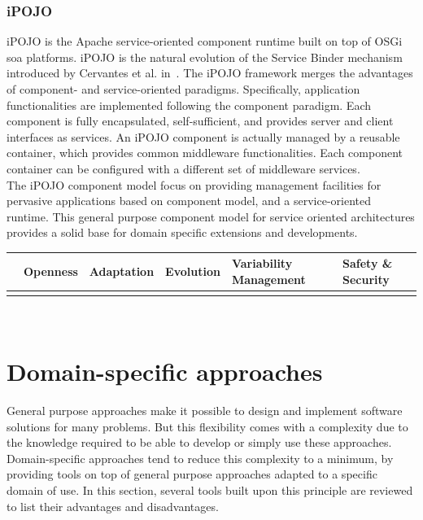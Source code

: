 \subsubsection{iPOJO}
iPOJO\cite{Escoffier:2007} is the Apache service-oriented component runtime built on top of OSGi \gls{soa} platforms. iPOJO is the natural evolution of the Service Binder mechanism introduced by Cervantes et al. in~\cite{Cervantes:2004}. The iPOJO framework merges the advantages of component- and service-oriented paradigms. Specifically, application functionalities are implemented following the component paradigm. Each component is fully encapsulated, self-sufficient, and provides server and client interfaces as services. An iPOJO component is actually managed by a reusable container, which provides common middleware functionalities. Each component container can be configured with a different set of middleware services.\\
The iPOJO component model focus on providing management facilities for pervasive applications based on component model, and a service-oriented runtime. This general purpose component model for service oriented architectures provides a solid base for domain specific extensions and developments.
 \\
\begin{tabular}{ >{\centering}m{}| >{\centering}m{} >{\centering}m{}| >{\centering}m{} >{\centering}m{}| >{\centering\arraybackslash}m{}}
{\tiny Interoperability} & {\tiny Openness} & {\tiny Adaptation} & {\tiny Evolution} & {\tiny Variability Management} & {\tiny Safety \& Security}\\
 \hline
  &  &  &  &  & \\ 
  \hline
\end{tabular}\\


\newpage
\section{Domain-specific approaches}
\label{sec:domainSpecificApproaches}

General purpose approaches make it possible to design and implement software solutions for many problems. But this flexibility comes with a complexity due to the knowledge required to be able to develop or simply use these approaches.\\

Domain-specific approaches tend to reduce this complexity to a minimum, by providing tools on top of general purpose approaches adapted to a specific domain of use. In this section, several tools built upon this principle are reviewed to list their advantages and disadvantages.


